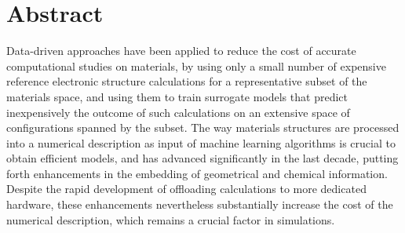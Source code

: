
\chapter*{Abstract}
Data-driven approaches have been applied to reduce the cost of accurate computational studies on materials, by using only a small number of expensive reference electronic structure calculations for a representative subset of the materials space, and using them to train surrogate models that predict inexpensively the outcome of such calculations on an extensive space of configurations spanned by the subset.
The way materials structures are processed into a numerical description as input of machine learning algorithms is crucial to obtain efficient models, and has advanced significantly in the last decade, putting forth enhancements in the embedding of geometrical and chemical information. %
%
Despite the rapid development of offloading calculations to more dedicated hardware, these enhancements nevertheless substantially increase the cost of the numerical description, which remains a crucial factor in simulations.
